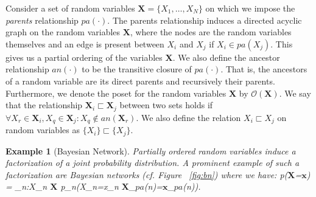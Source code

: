 \documentclass[letterpaper]{article} %
\newcommand{\cf}{cf.\xspace}
\newtheorem{example}[theorem]{Example}
\newenvironment{talign}
{\let\displaystyle\textstyle\align}
{\endalign}
\newcommand{\Xvars}{\ensuremath{\mathbf{X}}}
\newcommand{\xvars}{\ensuremath{\mathbf{x}}}
\newcommand{\Xvar}{\ensuremath{X}}
\newcommand{\parents}{\ensuremath{{pa}}}
\newcommand{\ancestors}{\ensuremath{{an}}}
\begin{document}
Consider a set of random variables $\Xvars {=}\{\Xvar_1,\dots, \Xvar_N \}$ on which we impose the \textit{parents} relationship $\parents(\cdot)$.
The parents relationship induces a directed acyclic graph on the random variables $\Xvars$, where the nodes are the random variables themselves and an edge is present between $\Xvar_i$ and $\Xvar_j$ if $\Xvar_i {\in} \parents(\Xvar_j)$.
This gives us a partial ordering of the variables $\Xvars$.
We also define the ancestor relationship $\ancestors(\cdot)$ to be the transitive closure of $\parents(\cdot)$. That is, the ancestors of a random variable are its direct parents and recursively their parents.
Furthermore, we denote the poset for the random variables $\Xvars$ by $\mathcal{O}(\Xvars)$. We say that the relationship $\Xvars_i {\sqsubset} \Xvars_j$ between two sets holds if
$
	\forall \Xvar_r {\in} \Xvars_i, \Xvar_q {\in} \Xvars_j : \Xvar_q {\notin}  \ancestors(\Xvars_r)
$.
We also define the relation $\Xvar_i\sqsubset \Xvar_j$ on random variables as $\{\Xvar_i \}{\sqsubset} \{\Xvar_j \}$.




\begin{example}[Bayesian Network]
	Partially ordered random variables induce a factorization of a joint probability distribution. A prominent example of such a factorization are Bayesian networks (\cf Figure ~\ref{fig:bn}) where we have:
	\begin{talign}
		\label{eq:bn}
		p(\Xvars{=}\xvars) = \prod_{n:\Xvar_n \in \Xvars} p_n(X_n{=}x_n \mid \Xvars_{\parents(n)}{=}\xvars_{\parents(n)}).
	\end{talign}
\end{example}
\end{document}
